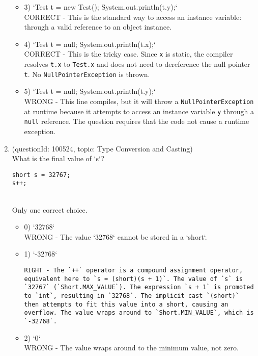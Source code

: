 \documentclass[12pt]{article}
\begin{document}
\begin{enumerate}[label=(\arabic*)]
\begin{itemize}
\item 3) `Test t = new Test(); System.out.println(t.y);`
 \\ 
CORRECT - This is the standard way to access an instance variable: through a valid reference to an object instance.

\item 4) `Test t = null; System.out.println(t.x);`
 \\ 
CORRECT - This is the tricky case. Since \verb|x| is static, the compiler resolves \verb|t.x| to \verb|Test.x| and does not need to dereference the null pointer \verb|t|. No \verb|NullPointerException| is thrown.

\item 5) `Test t = null; System.out.println(t.y);`
 \\ 
WRONG - This line compiles, but it will throw a \verb|NullPointerException| at runtime because it attempts to access an instance variable \verb|y| through a \verb|null| reference. The question requires that the code not cause a runtime exception.

\end{itemize}
\item (questionId: 100524, topic: Type Conversion and Casting) \\ 
What is the final value of `s`?
\begin{verbatim}
short s = 32767;
s++;
\end{verbatim}
\\ \noindent Only one correct choice. 
\begin{itemize}
\item 0) `32768`
 \\ 
WRONG - The value `32768` cannot be stored in a `short`.

\item 1) `-32768`
 \\ 
\begin{verbatim}RIGHT - The `++` operator is a compound assignment operator, equivalent here to `s = (short)(s + 1)`. The value of `s` is `32767` (`Short.MAX_VALUE`). The expression `s + 1` is promoted to `int`, resulting in `32768`. The implicit cast `(short)` then attempts to fit this value into a short, causing an overflow. The value wraps around to `Short.MIN_VALUE`, which is `-32768`.\end{verbatim}

\item 2) `0`
 \\ 
WRONG - The value wraps around to the minimum value, not zero.


\end{itemize}
\end{enumerate}
\end{document}
